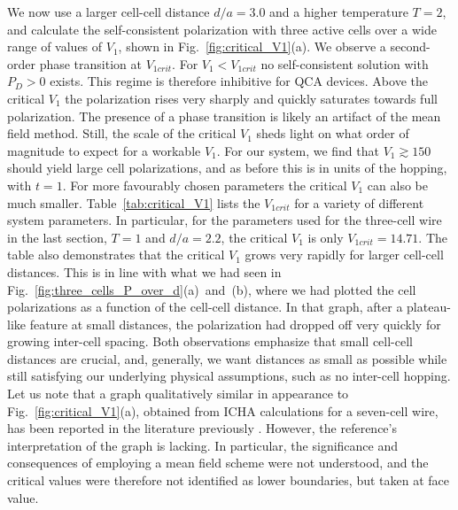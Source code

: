 We now use a larger cell-cell distance $d/a = 3.0$ and a higher temperature $T =
2$, and calculate the self-consistent polarization with three active cells over
a wide range of values of $V_1$, shown in Fig.~\ref{fig:critical_V1}(a). We
observe a second-order phase transition at $V_{1crit}$. For $V_1 < V_{1crit}$ no
self-consistent solution with $P_D > 0 $ exists. This regime is therefore
inhibitive for QCA devices. Above the critical $V_1$ the polarization rises very
sharply and quickly saturates towards full polarization. The presence of a phase
transition is likely an artifact of the mean field method. Still, the scale of
the critical $V_1$ sheds light on what order of magnitude to expect for a
workable $V_1$. For our system, we find that $V_1 \gtrsim 150$ should yield
large cell polarizations, and as before this is in units of the hopping, with $t
= 1$. For more favourably chosen parameters the critical $V_1$ can also be much
smaller. Table~\ref{tab:critical_V1} lists the $V_{1crit}$ for a variety of
different system parameters. In particular, for the parameters used for the
three-cell wire in the last section, $T = 1$ and $d/a = 2.2$, the critical $V_1$
is only $V_{1crit} = 14.71$. The table also demonstrates that the critical $V_1$
grows very rapidly for larger cell-cell distances. This is in line with what we
had seen in Fig.~\ref{fig:three_cells_P_over_d}(a)~and~(b), where we had plotted
the cell polarizations as a function of the cell-cell distance. In that graph,
after a plateau-like feature at small distances, the polarization had dropped
off very quickly for growing inter-cell spacing. Both observations emphasize
that small cell-cell distances are crucial, and, generally, we want distances as
small as possible while still satisfying our underlying physical assumptions,
such as no inter-cell hopping. Let us note that a graph qualitatively similar in
appearance to Fig.~\ref{fig:critical_V1}(a), obtained from ICHA calculations for
a seven-cell wire, has been reported in the literature previously
\cite{lent1993lines}. However, the reference's interpretation of the graph is
lacking. In particular, the significance and consequences of employing a mean
field scheme were not understood, and the critical values were therefore not
identified as lower boundaries, but taken at face value.

